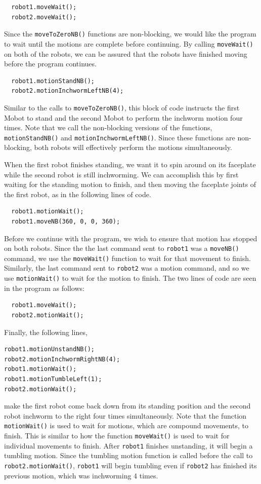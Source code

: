 \documentclass{article}
\begin{document}
\begin{verbatim}
  robot1.moveWait();
  robot2.moveWait();
\end{verbatim}
Since the \texttt{moveToZeroNB()} functions are non-blocking, we would like
the program to wait until the motions are complete before continuing. By
calling \texttt{moveWait()} on both of the robots, we can be assured that
the robots have finished moving before the program continues.

\begin{verbatim}
  robot1.motionStandNB();
  robot2.motionInchwormLeftNB(4);
\end{verbatim}
Similar to the calls to \texttt{moveToZeroNB()}, this block of code instructs 
the first Mobot to stand and the second Mobot to perform the inchworm motion four times.
Note that we call the non-blocking versions of the
functions, \texttt{motionStandNB()} and \texttt{motionInchwormLeftNB()}. Since these functions are
non-blocking, both robots will effectively perform the motions simultaneously. 

When the first robot finishes standing, we want it to spin around on its faceplate
while the second robot is still inchworming. We can accomplish this by first
waiting for the standing motion to finish, and then moving the faceplate joints
of the first robot, as in the following lines of code.
\begin{verbatim}
  robot1.motionWait();
  robot1.moveNB(360, 0, 0, 360);
\end{verbatim}

Before we continue with the program, we wish to ensure that motion has stopped on both
robots. Since the the last command sent to \texttt{robot1} was a \texttt{moveNB()}
command, we use the \texttt{moveWait()} function to wait for that movement to finish.
Similarly, the last command sent to \texttt{robot2} was a motion command, and so we
use \texttt{motionWait()} to wait for the motion to finish. The two lines of code
are seen in the program as follows:
\begin{verbatim}
  robot1.moveWait();
  robot2.motionWait();
\end{verbatim}

Finally, the following lines,
\begin{verbatim}
robot1.motionUnstandNB();
robot2.motionInchwormRightNB(4);
robot1.motionWait();
robot1.motionTumbleLeft(1);
robot2.motionWait();
\end{verbatim}
make the first robot come back down from its standing position and the second robot
inchworm to the right four times simultaneously. Note that the function 
\texttt{motionWait()} is used to wait for motions, which are compound
movements, to finish. This is similar to how
the function \texttt{moveWait()} is used to wait for individual movements
to finish. After \texttt{robot1} finishes unstanding, it will begin 
a tumbling motion. Since the tumbling motion function is called before the call
to \texttt{robot2.motionWait()}, \texttt{robot1} will begin tumbling even if
\texttt{robot2} has finished its previous motion, which was inchworming 4 times.
\end{document}
